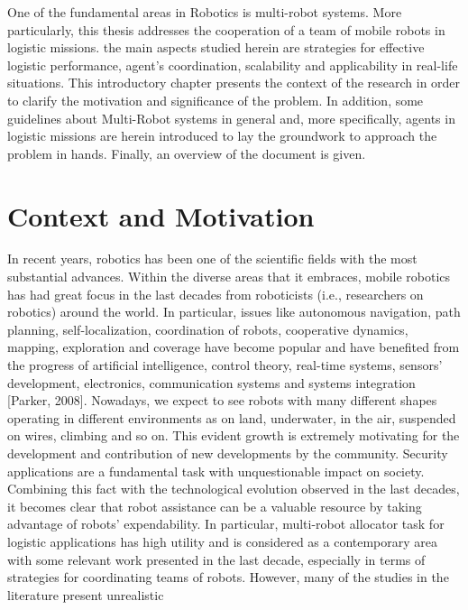 One of the fundamental areas in Robotics is multi-robot systems. More particularly,
this thesis addresses the cooperation of a team of mobile robots in logistic missions.
the main aspects studied herein are strategies for effective logistic performance,
agent's coordination, scalability and applicability in real-life situations.
\newline
This introductory chapter presents the context of the research in order to clarify
the motivation and significance of the problem. 
In addition, some guidelines about Multi-Robot systems in general and, more specifically,
agents in logistic missions are herein introduced to lay the groundwork to 
approach the problem in hands. 
Finally, an overview of the document is given. 

\section{Context and Motivation}
In recent years, robotics has been one of the scientific fields with the most substantial
advances. Within the diverse areas that it embraces, mobile robotics has
had great focus in the last decades from roboticists (i.e., researchers on robotics)
around the world. In particular, issues like autonomous navigation, path planning,
self-localization, coordination of robots, cooperative dynamics, mapping, exploration 
and coverage have become popular and have benefited from the progress
of artificial intelligence, control theory, real-time systems, sensors’ development,
electronics, communication systems and systems integration [Parker, 2008].
\newline
Nowadays, we expect to see robots with many different shapes operating in
different environments as on land, underwater, in the air, suspended on wires,
climbing and so on. This evident growth is extremely motivating for the development
 and contribution of new developments by the community.
\newline
Security applications are a fundamental task with unquestionable impact on
society. Combining this fact with the technological evolution observed in the last
decades, it becomes clear that robot assistance can be a valuable resource by
taking advantage of robots’ expendability. In particular, multi-robot allocator task for logistic applications
has high utility and is considered as a contemporary area with some relevant work
presented in the last decade, especially in terms of strategies for coordinating
teams of robots. However, many of the studies in the literature present unrealistic
